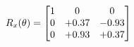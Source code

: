 \documentclass[preview]{standalone}
\begin{document}
\begin{align*}
\special{dvisvgm:raw <g id='unique000'>}R_{x}(\theta) = \begin{bmatrix}1 & 0 & 0 \\0 & +0.37 & -0.93 \\0 & +0.93 & +0.37\end{bmatrix}\special{dvisvgm:raw </g>}
\end{align*}
\end{document}
